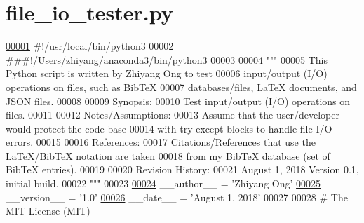 \hypertarget{file__io__tester_8py_source}{}\section{file\+\_\+io\+\_\+tester.\+py}
\label{file__io__tester_8py_source}

\begin{DoxyCode}
\hypertarget{file__io__tester_8py_source_l00001}{}\hyperlink{namespaceutilities_1_1file__io__tester}{00001} \textcolor{comment}{#!/usr/local/bin/python3}
00002 \textcolor{comment}{###!/Users/zhiyang/anaconda3/bin/python3}
00003 
00004 \textcolor{stringliteral}{"""}
00005 \textcolor{stringliteral}{    This Python script is written by Zhiyang Ong to test}
00006 \textcolor{stringliteral}{        input/output (I/O) operations on files, such as BibTeX}
00007 \textcolor{stringliteral}{        databases/files, LaTeX documents, and JSON files.}
00008 \textcolor{stringliteral}{}
00009 \textcolor{stringliteral}{    Synopsis:}
00010 \textcolor{stringliteral}{    Test input/output (I/O) operations on files.}
00011 \textcolor{stringliteral}{}
00012 \textcolor{stringliteral}{    Notes/Assumptions:}
00013 \textcolor{stringliteral}{    Assume that the user/developer would protect the code base}
00014 \textcolor{stringliteral}{        with try-except blocks to handle file I/O errors.}
00015 \textcolor{stringliteral}{}
00016 \textcolor{stringliteral}{    References:}
00017 \textcolor{stringliteral}{    Citations/References that use the LaTeX/BibTeX notation are taken}
00018 \textcolor{stringliteral}{        from my BibTeX database (set of BibTeX entries).}
00019 \textcolor{stringliteral}{}
00020 \textcolor{stringliteral}{    Revision History:}
00021 \textcolor{stringliteral}{    August 1, 2018          Version 0.1, initial build.}
00022 \textcolor{stringliteral}{"""}
00023 
\hypertarget{file__io__tester_8py_source_l00024}{}\hyperlink{namespaceutilities_1_1file__io__tester_a1e98e62ebd56ece4ec2a1b305f33aa72}{00024} \_\_author\_\_ = \textcolor{stringliteral}{'Zhiyang Ong'}
\hypertarget{file__io__tester_8py_source_l00025}{}\hyperlink{namespaceutilities_1_1file__io__tester_a18133e21b0a493dfcb0dcd31bd81a40e}{00025} \_\_version\_\_ = \textcolor{stringliteral}{'1.0'}
\hypertarget{file__io__tester_8py_source_l00026}{}\hyperlink{namespaceutilities_1_1file__io__tester_aff68b27f06e5ed552222d5e8ef71af1b}{00026} \_\_date\_\_ = \textcolor{stringliteral}{'August 1, 2018'}
00027 
00028 \textcolor{comment}{#   The MIT License (MIT)}

\end{DoxyCode}
